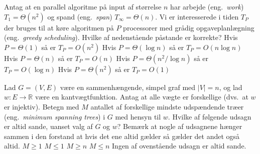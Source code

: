 Antag at en parallel algoritme på input af størrelse $n$ har arbejde (eng.~\emph{work}) $T_1=\Theta(n^2)$ og spand (eng.~\emph{span}) $T_\infty=\Theta(n)$.
Vi er interesserede i tiden $T_P$ der bruges til at køre algoritmen på $P$ processorer med grådig opgaveplanlægning (eng.~\emph{greedy scheduling}).
Hvilke af nedenstående påstande er korrekte?
\fleresvar
\mulighederstart
\svar Hvis $P=\Theta(1)$ så er $T_P=O(n^2)$ \korrekt
\svar Hvis $P=\Theta(\log n)$ så er $T_P=O(n \log n)$
\svar Hvis $P=\Theta(n)$ så er $T_P=O(n)$ \korrekt
\svar Hvis $P=\Theta(n^2/\log n)$ så er $T_P=O(\log n)$
\svar Hvis $P=\Theta(n^2)$ så er $T_P=O(1)$
\mulighederslut
{}




Lad $G = (V,E)$ være en sammenhængende, simpel graf med $|V|=n$, og lad $w : E \to \mathbb{R}$ være en kantvægtfunktion.
Antag at alle vægte er forskellige (dvs.~at $w$ er injektiv).
Betegn med $M$ antallet af forskellige mindste udspændende træer (eng.~\emph{minimum spanning trees}) i $G$ med hensyn til $w$.
Hvilke af følgende udsagn er altid sande, uanset valg af $G$ og $w$?
\fleresvar
Bemærk at nogle af udsagnene hænger sammen i den forstand at hvis det ene altid gælder så gælder det andet også altid.
\mulighederstart
\svar $M \geq 1$ \korrekt
\svar $M \leq 1$ \korrekt
\svar $M \geq n$
\svar $M \leq n$ \korrekt
\svar Ingen af ovenstående udsagn er altid sande.
\mulighederslut
{}



